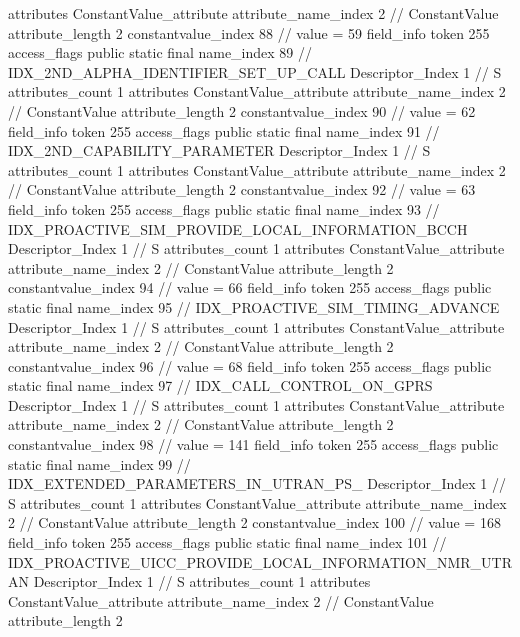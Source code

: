 {{{{{				attributes {
				ConstantValue_attribute {
					attribute_name_index	2		// ConstantValue
					attribute_length	2
					constantvalue_index	88		// value = 59
				}
				}
			}
			field_info {
				token	255
				access_flags	public static final
				name_index	89		// IDX_2ND_ALPHA_IDENTIFIER_SET_UP_CALL
				Descriptor_Index	1		// S
				attributes_count	1
				attributes {
				ConstantValue_attribute {
					attribute_name_index	2		// ConstantValue
					attribute_length	2
					constantvalue_index	90		// value = 62
				}
				}
			}
			field_info {
				token	255
				access_flags	public static final
				name_index	91		// IDX_2ND_CAPABILITY_PARAMETER
				Descriptor_Index	1		// S
				attributes_count	1
				attributes {
				ConstantValue_attribute {
					attribute_name_index	2		// ConstantValue
					attribute_length	2
					constantvalue_index	92		// value = 63
				}
				}
			}
			field_info {
				token	255
				access_flags	public static final
				name_index	93		// IDX_PROACTIVE_SIM_PROVIDE_LOCAL_INFORMATION_BCCH
				Descriptor_Index	1		// S
				attributes_count	1
				attributes {
				ConstantValue_attribute {
					attribute_name_index	2		// ConstantValue
					attribute_length	2
					constantvalue_index	94		// value = 66
				}
				}
			}
			field_info {
				token	255
				access_flags	public static final
				name_index	95		// IDX_PROACTIVE_SIM_TIMING_ADVANCE
				Descriptor_Index	1		// S
				attributes_count	1
				attributes {
				ConstantValue_attribute {
					attribute_name_index	2		// ConstantValue
					attribute_length	2
					constantvalue_index	96		// value = 68
				}
				}
			}
			field_info {
				token	255
				access_flags	public static final
				name_index	97		// IDX_CALL_CONTROL_ON_GPRS
				Descriptor_Index	1		// S
				attributes_count	1
				attributes {
				ConstantValue_attribute {
					attribute_name_index	2		// ConstantValue
					attribute_length	2
					constantvalue_index	98		// value = 141
				}
				}
			}
			field_info {
				token	255
				access_flags	public static final
				name_index	99		// IDX_EXTENDED_PARAMETERS_IN_UTRAN_PS_
				Descriptor_Index	1		// S
				attributes_count	1
				attributes {
				ConstantValue_attribute {
					attribute_name_index	2		// ConstantValue
					attribute_length	2
					constantvalue_index	100		// value = 168
				}
				}
			}
			field_info {
				token	255
				access_flags	public static final
				name_index	101		// IDX_PROACTIVE_UICC_PROVIDE_LOCAL_INFORMATION_NMR_UTRAN
				Descriptor_Index	1		// S
				attributes_count	1
				attributes {
				ConstantValue_attribute {
					attribute_name_index	2		// ConstantValue
					attribute_length	2
}}}}}}}
